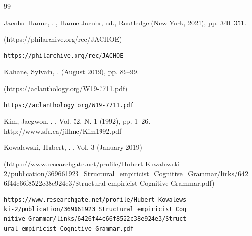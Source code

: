 \begin{thebibliography}{99}
{%

\begin{bItem}[HanneJacobs]
Jacobs, Hanne, 
.  
, 
Hanne Jacobs, ed.,   
Routledge (New York, 2021), pp. 340--351.
%
\begin{boxurl}(https://philarchive.org/rec/JACHOE)
\begin{lstlisting}
https://philarchive.org/rec/JACHOE
\end{lstlisting}
\end{boxurl}\end{bItem}




\begin{bItem}[Kahane]
Kahane, Sylvain, 
.  
(August 2019), pp. 89--99.
%
\begin{boxurl}(https://aclanthology.org/W19-7711.pdf)
\begin{lstlisting}
https://aclanthology.org/W19-7711.pdf
\end{lstlisting}
\end{boxurl}\end{bItem}





\begin{bItem}[JKim]
Kim, Jaegwon,
.
,
Vol. 52, N. 1 (1992), pp. 1--26. %
%
%
{http://www.sfu.ca/\tatilde{}jillmc/Kim1992.pdf}
\end{bItem}


\condenlargepage{4em}
%






\begin{bItem}[kow]
Kowalewski, Hubert, 
.  
, 
Vol. 3 (January 2019)
%
\begin{boxurl}(https://www.researchgate.net/profile/Hubert-Kowalewski-2/publication/369661923_Structural_empiricist_Cognitive_Grammar/links/6426f44c66f8522c38e924e3/Structural-empiricist-Cognitive-Grammar.pdf)
\begin{lstlisting}
https://www.researchgate.net/profile/Hubert-Kowalews
ki-2/publication/369661923_Structural_empiricist_Cog
nitive_Grammar/links/6426f44c66f8522c38e924e3/Struct
ural-empiricist-Cognitive-Grammar.pdf
\end{lstlisting}
\end{boxurl}\end{bItem}





}
\end{thebibliography}
